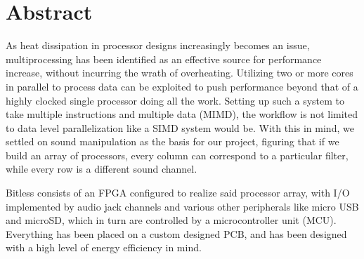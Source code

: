 \section*{Abstract}
As heat dissipation in processor designs increasingly becomes an issue,
multiprocessing has been identified as an effective source for performance
increase, without incurring the wrath of overheating. Utilizing two or more
cores in parallel to process data can be exploited to push performance beyond
that of a highly clocked single processor doing all the work. Setting up such
a system to take multiple instructions and multiple data (MIMD), the workflow
is not limited to data level parallelization like a SIMD system would be. With
this in mind, we settled on sound manipulation as the basis for our project,
figuring that if we build an array of processors, every column can correspond
to a particular filter, while every row is a different sound channel.
\newline

Bitless consists of an FPGA configured to realize said processor array, with
I/O implemented by audio jack channels and various other peripherals like micro
USB and microSD, which in turn are controlled by a microcontroller unit (MCU).
Everything has been placed on a custom designed PCB, and has been designed with
a high level of energy efficiency in mind.
\newline

